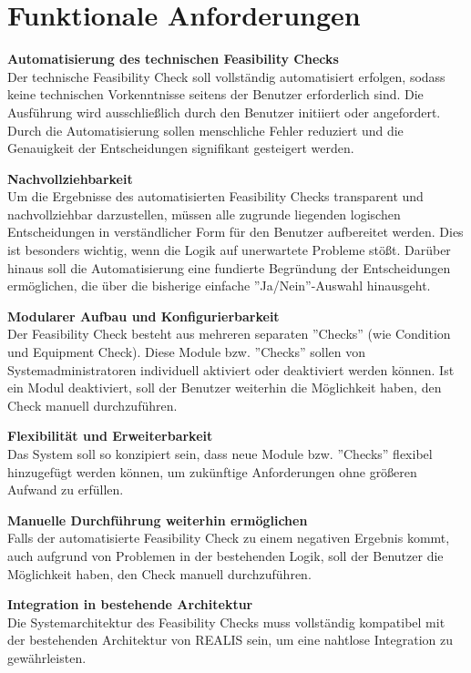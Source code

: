 \section{Funktionale Anforderungen} \label{Sec:funktionale-anforderungen}

\setlength{\leftskip}{1em} 
\textbf{Automatisierung des technischen Feasibility Checks}  \\
Der technische Feasibility Check soll vollständig automatisiert erfolgen, sodass keine technischen Vorkenntnisse seitens der Benutzer erforderlich sind. Die Ausführung wird ausschließlich durch den Benutzer initiiert oder angefordert. Durch die Automatisierung sollen menschliche Fehler reduziert und die Genauigkeit der Entscheidungen signifikant gesteigert werden.

\textbf{Nachvollziehbarkeit}  \\
Um die Ergebnisse des automatisierten Feasibility Checks transparent und nachvollziehbar darzustellen, müssen alle zugrunde liegenden logischen Entscheidungen in verständlicher Form für den Benutzer aufbereitet werden. Dies ist besonders wichtig, wenn die Logik auf unerwartete Probleme stößt. Darüber hinaus soll die Automatisierung eine fundierte Begründung der Entscheidungen ermöglichen, die über die bisherige einfache ''Ja/Nein''-Auswahl hinausgeht.

\textbf{Modularer Aufbau und Konfigurierbarkeit}  \\
Der Feasibility Check besteht aus mehreren separaten ''Checks'' (wie Condition und Equipment Check). Diese Module bzw. ''Checks'' sollen von Systemadministratoren individuell aktiviert oder deaktiviert werden können. Ist ein Modul deaktiviert, soll der Benutzer weiterhin die Möglichkeit haben, den Check manuell durchzuführen.

\textbf{Flexibilität und Erweiterbarkeit}  \\
Das System soll so konzipiert sein, dass neue Module bzw. ''Checks'' flexibel hinzugefügt werden können, um zukünftige Anforderungen ohne größeren Aufwand zu erfüllen.

\textbf{Manuelle Durchführung weiterhin ermöglichen}  \\
Falls der automatisierte Feasibility Check zu einem negativen Ergebnis kommt, auch aufgrund von Problemen in der bestehenden Logik, soll der Benutzer die Möglichkeit haben, den Check manuell durchzuführen.

\textbf{Integration in bestehende Architektur}  \\
Die Systemarchitektur des Feasibility Checks muss vollständig kompatibel mit der bestehenden Architektur von \gls{REALIS} sein, um eine nahtlose Integration zu gewährleisten.

\setlength{\leftskip}{0em} 
